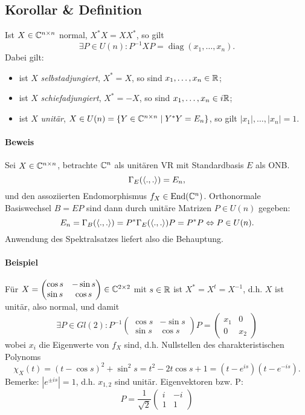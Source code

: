 \subsection{Korollar \& Definition}	
\begin{Korollar}[]
	Ist $ X\in \mathbb{C}^{n\times n} $ normal, $ X^*X = XX^* $, so gilt
		\[ \exists P\in U(n): P^{-1}XP=\operatorname{diag}(x_1,\dots,x_n). \]
	Dabei gilt:
		\begin{itemize}
			\item ist $ X $ \emph{selbstadjungiert}, $ X^*=X $, so sind $ x_1,\dots,x_n \in \mathbb{R} $;
			\item ist $ X $ \emph{schiefadjungiert}, $ X^*=-X $, so sind $ x_1,\dots,x_n\in i\mathbb{R} $;
			\item ist $ X $ \emph{unitär}, $ X\in U(n)= \{Y\in \mathbb{C}^{n\times n}\mid Y^*Y=E_n\} $, so gilt $ |x_1|,\dots,|x_n| = 1. $
		\end{itemize}
\end{Korollar}
\paragraph{Beweis}
	Sei $ X\in \mathbb{C}^{n\times n} $, betrachte $ \mathbb{C}^n $ als unitären VR mit Standardbasis $ E $ als ONB.
		\[ \Gamma_E(\langle .,. \rangle) = E_n, \]
	und den assoziierten Endomorphismus $ f_X\in \operatorname{End}(\mathbb{C}^n) $. Orthonormale Basiswechsel $ B=EP $ sind dann durch unitäre Matrizen $ P\in U(n) $ gegeben:
		\[ E_n = \Gamma_B(\langle .,. \rangle) = P^*\Gamma_E(\langle .,. \rangle)P = P^*P \Leftrightarrow P\in U(n). \]
	Anwendung des Spektralsatzes liefert also die Behauptung.

\paragraph{Beispiel}
	Für  $ X = \begin{pmatrix}
	\cos s & -\sin s\\ \sin s & \cos s
	\end{pmatrix}\in \mathbb{C}^{2\times 2} $ mit $ s\in \mathbb{R} $ ist $ X^*=X^t = X^{-1} $, d.h. $ X $ ist unitär, also normal, und damit
		\[ \exists P\in Gl(2): P^{-1}\begin{pmatrix}
		\cos s & -\sin s\\ \sin s & \cos s
		\end{pmatrix}P = \begin{pmatrix}
		x_1 & 0 \\ 0 & x_2
		\end{pmatrix} \]
	wobei $ x_i $ die Eigenwerte von $ f_X $ sind, d.h. Nullstellen des charakteristischen Polynoms
		\[ \chi_X(t) = (t-\cos s)^2 + \sin^2 s = t^2-2t\cos s + 1 = (t-e^{is})(t-e^{-is}). \]
	Bemerke: $ |e^{\pm is}| = 1 $, d.h. $ x_{1,2} $ sind unitär. Eigenvektoren bzw. P:
		\[ P = \frac{1}{\sqrt{2}}\begin{pmatrix} i & -i \\ 1 & 1 \end{pmatrix} \]

